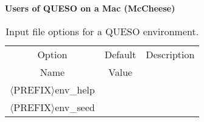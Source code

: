 \documentclass[12pt,letterpaper,twoside,onecolumn,portrait,leqno]{book}
\begin{document}
\setlength{\unitlength}{1.0in}
\setlength{\parindent}{0cm}
\setlength{\parskip}{2ex}
\thispagestyle{empty}

\centerline\bf{Users of QUESO on a Mac (McCheese)}\\

\begin{table}[!h]
\begin{center}
\begin{tabular}{|l|c|c|}
\hline
\multicolumn{1}{|c|}{Option}                      & Default & Description \\
\multicolumn{1}{|c|}{Name}                        & Value   &             \\
\hline
\hline
$\langle$PREFIX$\rangle$env\_help                 &         &             \\
\hline
$\langle$PREFIX$\rangle$env\_seed                 &         &             \\
\hline
\end{tabular}
\end{center}
\caption{
Input file options for a QUESO environment.
}
\label{tab-env-options}
\end{table}
\end{document}
